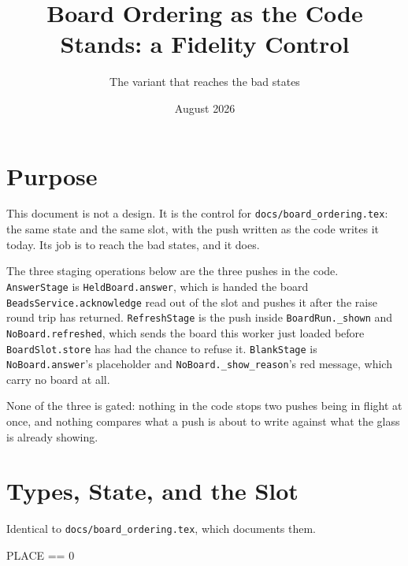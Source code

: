 \documentclass[a4paper,10pt,fleqn]{article}
\begin{document}
\title{Board Ordering as the Code Stands: a Fidelity Control}
\author{The variant that reaches the bad states}
\date{August 2026}
\maketitle

\section{Purpose}

This document is not a design. It is the control for
\texttt{docs/board\_ordering.tex}: the same state and the same slot, with the
push written as the code writes it today. Its job is to reach the bad states,
and it does.

The three staging operations below are the three pushes in the code.
\texttt{AnswerStage} is \texttt{HeldBoard.answer}, which is handed the board
\texttt{BeadsService.acknowledge} read out of the slot and pushes it after the
raise round trip has returned. \texttt{RefreshStage} is the push inside
\texttt{BoardRun.\_shown} and \texttt{NoBoard.refreshed}, which sends the board
this worker just loaded before \texttt{BoardSlot.store} has had the chance to
refuse it. \texttt{BlankStage} is \texttt{NoBoard.answer}'s placeholder and
\texttt{NoBoard.\_show\_reason}'s red message, which carry no board at all.

None of the three is gated: nothing in the code stops two pushes being in flight
at once, and nothing compares what a push is about to write against what the
glass is already showing.

\section{Types, State, and the Slot}

Identical to \texttt{docs/board\_ordering.tex}, which documents them.

\begin{zed}
  [WORKER]
\end{zed}

\begin{zed}
  PLACE == 0 
\end{zed}
\end{document}
